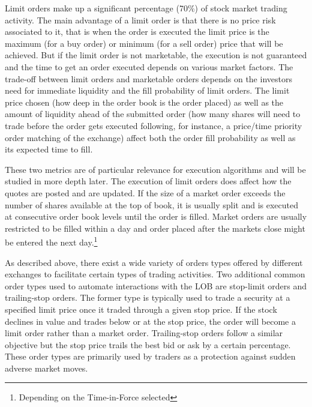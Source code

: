 Limit orders make up a significant percentage (70\%) of stock market trading activity. The main advantage of a limit order is that there is no price risk associated to it, that is when the order is executed the limit price is the maximum (for a buy order) or minimum (for a sell order) price that will be achieved. But if the limit order is not marketable, the execution is not guaranteed and the time to get an order executed depends on various market factors. The trade-off between limit orders and marketable orders depends on the investors need for immediate liquidity and the fill probability of limit orders. The limit price chosen (how deep in the order book is the order placed) as well as the amount of liquidity ahead of the submitted order (how many shares will need to trade before the order gets executed following, for instance, a price/time priority order matching of the exchange) affect both the order fill probability as well as its expected time to fill. 


These two metrics are of particular relevance for execution algorithms and will be studied in more depth later. The execution of limit orders does affect how the quotes are posted and are updated. If the size of a market order exceeds the number of shares available at the top of book, it is usually split and is executed at consecutive order book levels until the order is filled. Market orders are usually restricted to be filled within a day and order placed after the markets close might be entered the next day.\footnote{Depending on the Time-in-Force selected}


As described above, there exist a wide variety of orders types offered by different exchanges to facilitate certain types of trading activities. Two additional common order types used to automate interactions with the LOB are stop-limit orders and trailing-stop orders. The former type is typically used to trade a security at a specified limit price once it traded through a given stop price. If the stock declines in value and trades below or at the stop price, the order will become a limit order rather than a market order. Trailing-stop orders follow a similar objective but the stop price trails the best bid or ask by a certain percentage. These order types are primarily used by traders as a protection against sudden adverse market moves. \\


